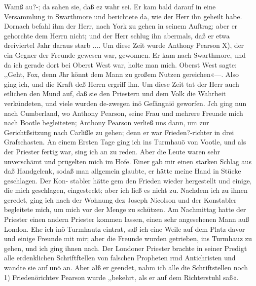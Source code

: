 Wamß au?-; da sahen sie, daß ez wahr sei. Er kam bald darauf
in eine Versammlung in Swarthmore und berichtete da, wie
der Herr ihn geheilt habe. Dornach befahl ihm der Herr, nach
York zu gehen in seinem Auftrag; aber er gehorchte dem Herrn
nicht; und der Herr schlug ihn abermals, daß er etwa dreiviertel
Jahr daraus starb ....
Um diese Zeit wurde Anthony Pearson X), der ein Gegner der
Freunde gewesen war, gewonnen. Er kam nach Swarthmore,
und da ich gerade dort bei Oberst West war, holte man mich.
Oberst West sagte: ,,Geht, Fox, denn Jhr könnt dem Mann zu
großem Nutzen gereichen«—. Also ging ich, und die Kraft deß
Herrn ergriff ihn.
Um diese Zeit tat der Herr auch etlichen den Mund auf,
daß sie den Priestern und dem Volk die Wahrheit verkündeten,
und viele wurden de-zwegen inö Gefängniö geworfen. Jch ging
nun nach Cumberland, wo Anthony Pearson, seine Frau und
mehrere Freunde mich nach Bootle begleiteten; Anthony Pearson
verließ uns dann, um zur Gerichtßsitzung nach Carlißle zu gehen;
denn er war Frieden?-richter in drei Grafschasten. An einem
Ersten Tage ging ich ins Turmhauö von Vootle, und als der
Priester fertig war, sing ich an zu reden. Aber die Leute waren
sehr unverschämt und prügelten mich im Hofe. Einer gab mir
einen starken Schlag aus daß Handgelenk, sodaß man allgemein
glaubte, er hätte meine Hand in Stücke geschlagen. Der Kon-
stabler hätte gem den Frieden wieder hergestellt und einige, die
mich geschlagen, eingesteckt; aber ich ließ es nicht zu. Nachdem
ich zu ihnen geredet, ging ich nach der Wohnung dez Joseph
Nicolson und der Konstabler begleitete mich, um mich vor der
Menge zu schützen.
Am Nachmittag hatte der Priester einen andern Priester
kommen lassen, einen sehr angesehenen Mann auß London. Ehe
ich inö Turmhautz eintrat, saß ich eine Weile auf dem Platz davor
und einige Freunde mit mir; aber die Freunde wurden getrieben, ins
Turmhauz zu gehen, und ich ging ihnen nach. Der Londoner
Priester brachte in seiner Predigt alle erdenklichen Schriftftellen
von falschen Propheten rmd Antichristen und wandte sie auf unö
an. Aber alß er geendet, nahm ich alle die Schriftstellen noch
1) Friedenörichtev Pearson wurde ,,bekehrt, als er auf dem Richterstuhl saß«.


